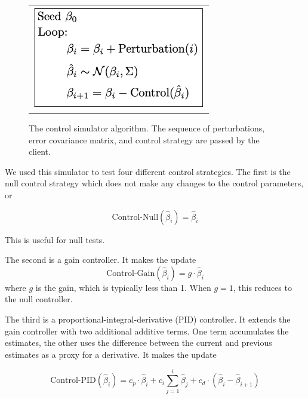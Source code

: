 \begin{figure}[!htbp]
\begin{center}
\begin{tabular}{c}
\includegraphics[width=3in]{figs/control/algo.png}
\end{tabular}
\end{center}
\caption[Control Simulator Algorithm]{The control simulator algorithm. The sequence of perturbations, error covariance matrix, and control strategy are passed by the client.\label{fig:control-algo}}
\end{figure}

We used this simulator to test four different control strategies. The first is the null control strategy which does not make any changes to the control parameters, or 

\begin{equation*}
\text{Control-Null}(\hat{\beta}_i) = \hat{\beta}_i
\end{equation*}

\noindent This is useful for null tests.

The second is a gain controller. It makes the update 
\begin{equation*}
\text{Control-Gain}(\hat{\beta}_i) = g \cdot \hat{\beta}_i
\end{equation*} 
\noindent where $g$ is the gain, which is typically less than 1. When $g=1$, this reduces to the null controller.

The third is a proportional-integral-derivative (PID) controller. It extends the gain controller with two additional additive terms. One term accumulates the estimates, the other uses the difference between the current and previous estimates as a proxy for a derivative. It makes the update

\begin{equation*}
\text{Control-PID}(\hat{\beta}_i) = c_p \cdot \hat{\beta}_i + c_i \sum_{j=1}^i \hat{\beta}_j + c_d \cdot (\hat{\beta}_i - \hat{\beta}_{i+1})
\end{equation*}

